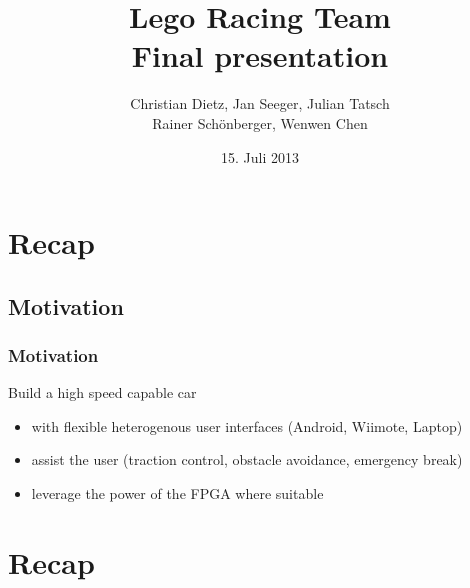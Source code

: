 \documentclass[pdf]{beamer}
\begin{document}
\title[Lego Racing Team]{Lego Racing Team\\\small{Final presentation}}
\author[...]{Christian Dietz, Jan Seeger, Julian Tatsch \\ Rainer Sch\"{o}nberger, Wenwen Chen\\}
\date{15. Juli 2013}

\subject{Final presentation}

\frame{
 \titlepage
}



\section{Recap}
\subsection{Motivation}
\begin{frame}
\frametitle{Motivation}
\begin{exampleblock}{Build a high speed capable car}
\begin{itemize}
  \item with flexible heterogenous user interfaces (Android, Wiimote, Laptop)
  \item assist the user (traction control, obstacle avoidance, emergency break)
  \item leverage the power of the FPGA where suitable
\end{itemize}
\end{exampleblock}
\end{frame}

\section{Recap}
\end{document}
